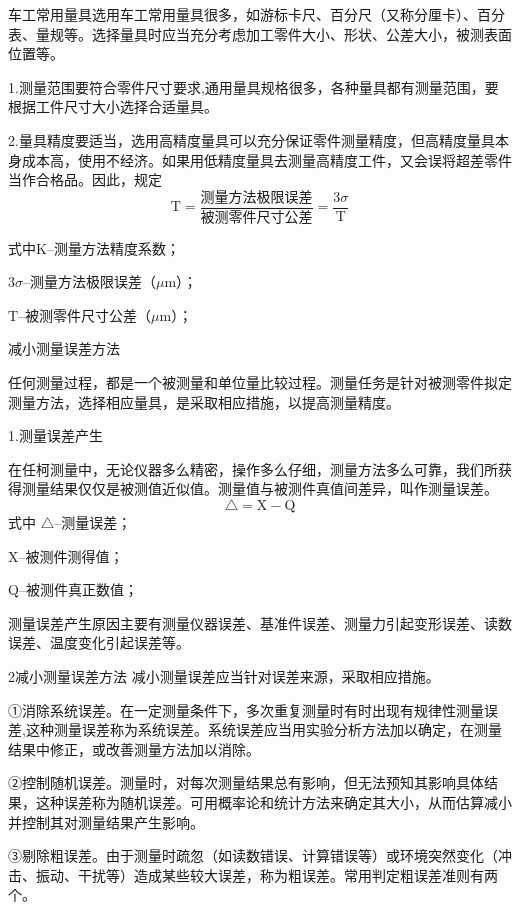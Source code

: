 \documentclass{ctexbook}
\begin{document}
车工常用量具选用车工常用量具很多，如游标卡尺、百分尺（又称分厘卡）、百分表、量规等。选择量具时应当充分考虑加工零件大小、形状、公差大小，被测表面位置等。

1.测量范围要符合零件尺寸要求,通用量具规格很多，各种量具都有测量范围，要根据工件尺寸大小选择合适量具。

2.量具精度要适当，选用高精度量具可以充分保证零件测量精度，但高精度量具本身成本高，使用不经济。如果用低精度量具去测量高精度工件，又会误将超差零件当作合格品。因此，规定
\begin{equation*}
	\text{T}=\frac{\text{测量方法极限误差}}{\text{被测零件尺寸公差}}=\frac{3\sigma}{\text{T}}
\end{equation*}

式中K--测量方法精度系数；

3$\sigma$--测量方法极限误差（$\mu$m）；

T--被测零件尺寸公差（$\mu$m）；

减小测量误差方法

任何测量过程，都是一个被测量和单位量比较过程。测量任务是针对被测零件拟定测量方法，选择相应量具，是采取相应措施，以提高测量精度。

1.测量误差产生

在任柯测量中，无论仪器多么精密，操作多么仔细，测量方法多么可靠，我们所获得测量结果仅仅是被测值近似值。测量值与被测件真值间差异，叫作测量误差。
\begin{equation*}
	\bigtriangleup =\text{X}-\text{Q}
\end{equation*}
式中 $\bigtriangleup$--测量误差；

X--被测件测得值；

Q--被测件真正数值；

测量误差产生原因主要有测量仪器误差、基准件误差、测量力引起变形误差、读数误差、温度变化引起误差等。

2减小测量误差方法
减小测量误差应当针对误差来源，采取相应措施。

①消除系统误差。在一定测量条件下，多次重复测量时有时出现有规律性测量误差,这种测量误差称为系统误差。系统误差应当用实验分析方法加以确定，在测量结果中修正，或改善测量方法加以消除。

②控制随机误差。测量时，对每次测量结果总有影响，但无法预知其影响具体结果，这种误差称为随机误差。可用概率论和统计方法来确定其大小，从而估算减小并控制其对测量结果产生影响。

③剔除粗误差。由于测量时疏忽（如读数错误、计算错误等）或环境突然变化（冲击、振动、干扰等）造成某些较大误差，称为粗误差。常用判定粗误差准则有两个。
\end{document}
